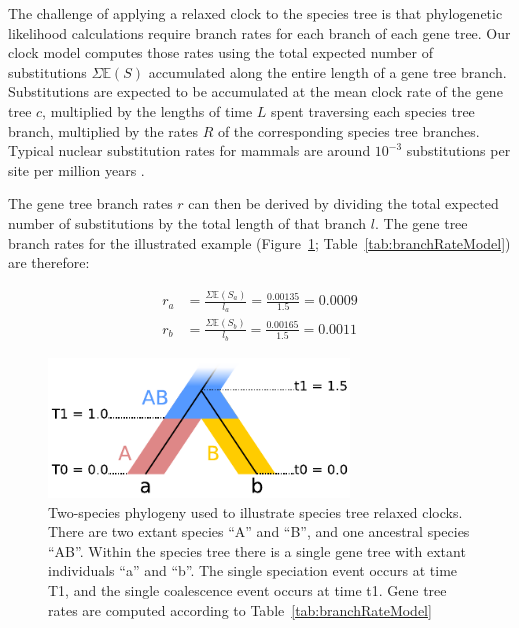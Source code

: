 \documentclass[nogrid]{MBE}%
\begin{document}
The challenge of applying a relaxed clock to the species tree is that
phylogenetic likelihood calculations require branch rates for each branch of
each gene tree. Our clock model computes those rates using the total expected
number of substitutions $\Sigma \mathbb{E}(S)$ accumulated along the entire
length of a gene tree branch. Substitutions are expected to be accumulated at
the mean clock rate of the gene tree $c$, multiplied by the lengths of time
$L$ spent traversing each species tree branch, multiplied by the rates $R$ of
the corresponding species tree branches.
Typical nuclear substitution rates for mammals are around $10^{-3}$ substitutions per
site per million years \citep{Phillips06102009}.

The gene tree branch rates $r$ can then be derived by dividing the total
expected number of substitutions by the total length of that branch $l$. The
gene tree branch rates for the illustrated example
(Figure~\ref{fig:branchRateModel}; Table~\ref{tab:branchRateModel}) are
therefore:

\begin{align}
r_a &= \frac{\Sigma \mathbb{E}(S_a)}{l_a} = \frac{0.00135}{1.5} = 0.0009\\
r_b &= \frac{\Sigma \mathbb{E}(S_b)}{l_b} = \frac{0.00165}{1.5} = 0.0011
\end{align}

\begin{figure}[htb!]
\centering
\includegraphics[width=80mm]{relaxed_clock.pdf}
\caption
{Two-species phylogeny used to illustrate species tree relaxed
clocks. There are two extant species ``A'' and ``B'', and one ancestral species ``AB''.
Within the species tree there is a single gene tree with extant individuals ``a''
and ``b''. The single speciation event occurs at time T1, and the single coalescence
event occurs at time t1. Gene tree rates are computed according to Table~\ref{tab:branchRateModel}}
\label{fig:branchRateModel}
\end{figure}
\end{document}

